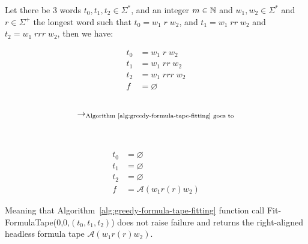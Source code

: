 \newpage

\begin{lemma}\label{lem:greedy}
    Let there be 3 words $t_0, t_1, t_2 \in \Sigma^*$, and an integer $m\in\mathbb{N}$ and $w_1, w_2 \in \Sigma^*$ and $r \in\Sigma^+$ the longest word such that $t_0 = w_1\; r\; w_2$, and $t_1 = w_1\; rr\; w_2$ and $t_2 = w_1\; rrr\; w_2$, then we have:
    \setlength{\columnsep}{-6.5cm}
    \begin{multicols}{3}
        \noindent
        \begin{align*}
            t_0 & = w_1\; r\; w_2   \\
            t_1 & = w_1\; rr\; w_2  \\
            t_2 & = w_1\; rrr\; w_2 \\
            f   & = \varnothing
        \end{align*}
        \begin{align*}
             &                                                                   \\
            \to_{\text{Algorithm~\ref{alg:greedy-formula-tape-fitting} goes to}} \\
             &                                                                   \\
             &
        \end{align*}
        \begin{align*}
            t_0 & = \varnothing              \\
            t_1 & = \varnothing              \\
            t_2 & = \varnothing              \\
            f   & = \mathcal{A}(w_1r(r) w_2)
        \end{align*}
    \end{multicols}
    Meaning that Algorithm~\ref{alg:greedy-formula-tape-fitting} function call {\sc Fit-FormulaTape}(0,0,$(t_0,t_1,t_2)$) does not raise failure and returns the right-aligned headless formula tape $\mathcal{A}(w_1r(r) w_2)$.
\end{lemma}
